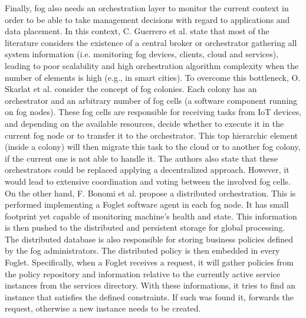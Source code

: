 \noindent\tab Finally, fog also needs an orchestration layer to monitor the current context in order to be able to take management decisions with regard to applications and data placement. In this context, C. Guerrero et al. \cite{guerrero2018influence} state that most of the literature considers the existence of a central broker or orchestrator gathering all system information (i.e. monitoring fog devices, clients, cloud and services), leading to poor scalability and high orchestration algorithm complexity when the number of elements is high (e.g., in smart cities). To overcome this bottleneck, O. Skarlat et al. \cite{skarlat2016resource,skarlat2017optimized} consider the concept of fog colonies. Each colony has an orchestrator and an arbitrary number of fog cells (a software component running on fog nodes). These fog cells are responsible for receiving tasks from IoT devices, and depending on the available resources, decide whether to execute it in the current fog node or to transfer it to the orchestrator. This top hierarchic element (inside a colony) will then migrate this task to the cloud or to another fog colony, if the current one is not able to handle it. The authors also state that these orchestrators could be replaced applying a decentralized approach. However, it would lead to extensive coordination and voting between the involved fog cells. On the other hand, F. Bonomi et al. \cite{bonomi2014fog} propose a distributed orchestration. This is performed implementing a Foglet software agent in each fog node. It has small footprint yet capable of monitoring machine's health and state. This information is then pushed to the distributed and persistent storage for global processing. The distributed database is also responsible for storing business policies defined by the fog administrators. The distributed policy is then embedded in every Foglet. Specifically, when a Foglet receives a request, it will gather policies from the policy repository and information relative to the currently active service instances from the services directory. With these informations, it tries to find an instance that satisfies the defined constraints. If such was found it, forwards the request, otherwise a new instance needs to be created.\\
